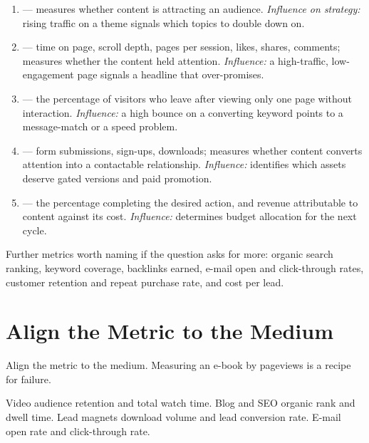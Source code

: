 \documentclass{MMTextbook}
\begin{document}
\begin{enumerate}
\item {} --- measures whether content is
      attracting an audience. \emph{Influence on strategy:} rising traffic on a
      theme signals which topics to double down on.
\item {} --- time on page, scroll depth, pages per session,
      likes, shares, comments; measures whether the content held attention.
      \emph{Influence:} a high-traffic, low-engagement page signals a headline
      that over-promises.
\item {} --- the percentage of visitors who leave after viewing
      only one page without interaction. \emph{Influence:} a high bounce on a
      converting keyword points to a message-match or a speed problem.
\item {} --- form submissions, sign-ups, downloads; measures
      whether content converts attention into a contactable relationship.
      \emph{Influence:} identifies which assets deserve gated versions and paid
      promotion.
\item {} --- the percentage completing the desired
      action, and revenue attributable to content against its cost.
      \emph{Influence:} determines budget allocation for the next cycle.
\end{enumerate}

Further metrics worth naming if the question asks for more: organic search
ranking, keyword coverage, backlinks earned, e-mail open and click-through
rates, customer retention and repeat purchase rate, and cost per lead.

\section{Align the Metric to the Medium}

\begin{warnbox}
Align the metric to the medium. Measuring an e-book by pageviews is a recipe for
failure.

\smallskip
Video \ra{} audience retention and total watch time. Blog and SEO \ra{} organic
rank and dwell time. Lead magnets \ra{} download volume and lead conversion
rate. E-mail \ra{} open rate and click-through rate.
\end{warnbox}
\end{document}
